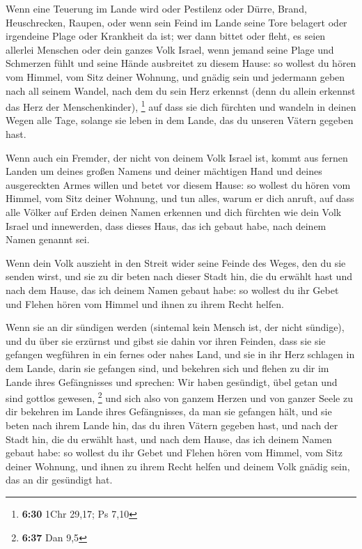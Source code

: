  Wenn eine Teuerung im Lande wird oder Pestilenz oder
Dürre, Brand, Heuschrecken, Raupen, oder wenn sein Feind im Lande seine
Tore belagert oder irgendeine Plage oder Krankheit da ist; 
wer dann bittet oder fleht, es seien allerlei Menschen oder dein ganzes
Volk Israel, wenn jemand seine Plage und Schmerzen fühlt und seine Hände
ausbreitet zu diesem Hause:  so wollest du hören vom
Himmel, vom Sitz deiner Wohnung, und gnädig sein und jedermann geben
nach all seinem Wandel, nach dem du sein Herz erkennst (denn du allein
erkennst das Herz der Menschenkinder), \footnote{\textbf{6:30} 1Chr
  29,17; Ps 7,10}  auf dass sie dich fürchten und wandeln
in deinen Wegen alle Tage, solange sie leben in dem Lande, das du
unseren Vätern gegeben hast.

 Wenn auch ein Fremder, der nicht von deinem Volk Israel
ist, kommt aus fernen Landen um deines großen Namens und deiner
mächtigen Hand und deines ausgereckten Armes willen und betet vor diesem
Hause:  so wollest du hören vom Himmel, vom Sitz deiner
Wohnung, und tun alles, warum er dich anruft, auf dass alle Völker auf
Erden deinen Namen erkennen und dich fürchten wie dein Volk Israel und
innewerden, dass dieses Haus, das ich gebaut habe, nach deinem Namen
genannt sei.

 Wenn dein Volk auszieht in den Streit wider seine Feinde
des Weges, den du sie senden wirst, und sie zu dir beten nach dieser
Stadt hin, die du erwählt hast und nach dem Hause, das ich deinem Namen
gebaut habe:  so wollest du ihr Gebet und Flehen hören vom
Himmel und ihnen zu ihrem Recht helfen.

 Wenn sie an dir sündigen werden (sintemal kein Mensch ist,
der nicht sündige), und du über sie erzürnst und gibst sie dahin vor
ihren Feinden, dass sie sie gefangen wegführen in ein fernes oder nahes
Land,  und sie in ihr Herz schlagen in dem Lande, darin sie
gefangen sind, und bekehren sich und flehen zu dir im Lande ihres
Gefängnisses und sprechen: Wir haben gesündigt, übel getan und sind
gottlos gewesen, \footnote{\textbf{6:37} Dan 9,5}  und sich
also von ganzem Herzen und von ganzer Seele zu dir bekehren im Lande
ihres Gefängnisses, da man sie gefangen hält, und sie beten nach ihrem
Lande hin, das du ihren Vätern gegeben hast, und nach der Stadt hin, die
du erwählt hast, und nach dem Hause, das ich deinem Namen gebaut habe:
 so wollest du ihr Gebet und Flehen hören vom Himmel, vom
Sitz deiner Wohnung, und ihnen zu ihrem Recht helfen und deinem Volk
gnädig sein, das an dir gesündigt hat.

